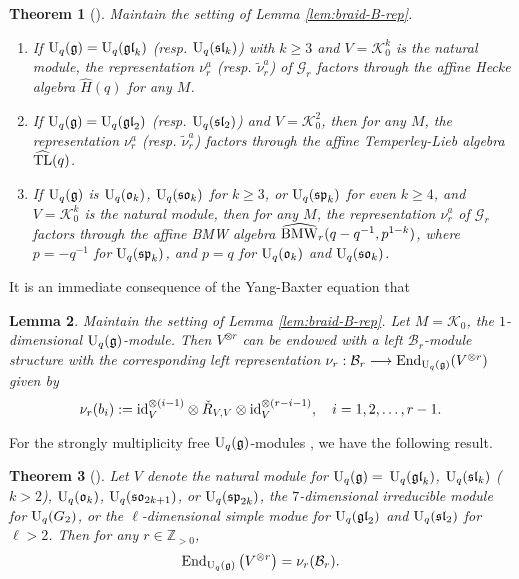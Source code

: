 \documentclass[12pt]{amsart}
\newtheorem{theorem}{Theorem}[section]
\newtheorem{lemma}[theorem]{Lemma}
\theoremstyle{definition}
\theoremstyle{remark}
\numberwithin{equation}{section}
\newcommand{\Z}{{\mathbb Z}}
\newcommand{\CB}{{\mathcal B}}
\newcommand{\CG}{{\mathcal G}}
\newcommand{\CK}{{\mathcal K}}
\newcommand{\id}{{\rm{id}}}
\newcommand{\mf}{\mathfrak}
\newcommand{\fg}{{\mf g}}
\newcommand{\be}{\begin{equation}}
\newcommand{\ee}{\end{equation}}
\newcommand{\U}{{\rm{U}}}
\newcommand{\End}{{\rm{End}}}
\newcommand{\fsl}{{\mathfrak {sl}}}
\newcommand{\gl}{{\mathfrak {gl}}}
\newcommand{\HH}{\widehat{H}}
\newcommand{\HTL}{\widehat{\rm TL}}
\newcommand{\HBMW}{\widehat{\rm BMW}}
\begin{document}
\begin{theorem}[\cite{DRV}] \label{thm:aff-Hecke-reps}
Maintain the setting of Lemma \ref{lem:braid-B-rep}. 
\begin{enumerate}
\item If $\U_q (\fg)=\U_q (\gl_k)$ (resp. $\U_q(\fsl_k)$) with $k\ge 3$ and $V=\CK_0^k$ is the natural module, 
 the  representation $\nu_r^a$ (resp. $\tilde\nu_r^a$) of $\CG_r$ factors through the affine Hecke algebra $\HH(q)$
 for any $M$. 

\item   If $\U_q (\fg)=\U_q (\gl_2)$ (resp. $\U_q(\fsl_2)$) and $V=\CK_0^2$,  then for any $M$, the representation $\nu_r^a$
(resp. $\tilde\nu_r^a$) factors through the affine Temperley-Lieb algebra $\HTL(q)$.

\item If $\U_q (\fg)$ is $\U_q (\mathfrak{o}_k)$,  $\U_q(\mathfrak{so}_k)$ for $k\ge 3$, or $\U_q (\mathfrak{sp}_k)$ for 
even $k\ge 4$, and $V=\CK_0^k$ is the natural module, 
then for any $M$, the  representation $\nu_r^a$ of $\CG_r$ factors through the affine BMW algebra $\HBMW_r(q-q^{-1},  p^{1-k})$,
where $p= -q^{-1}$ for  $\U_q (\mathfrak{sp}_k)$, and $p=q$ for $\U_q (\mathfrak{o}_k)$  and $\U_q(\mathfrak{so}_k)$.
\end{enumerate}
\end{theorem}
It is an immediate consequence of the Yang-Baxter equation that 
\begin{lemma}\label{lem:braid-rep}
Maintain the setting of Lemma \ref{lem:braid-B-rep}. Let $M=\CK_0$, the $1$-dimensional $\U_q(\fg)$-module.  Then
$V^{\otimes r}$ can be endowed with a left $\CB_r$-module structure with the corresponding left representation 
$\nu_r:  \CB_r\longrightarrow \End_{\U_q(\fg)}(V^{\otimes r})$ given by 
\be\label{eq:nu}
\nu_r(b_i):=\id_V^{\otimes (i-1)}\otimes\check{R}_{V, V}\otimes \id_V^{\otimes (r-i-1)},\quad i=1, 2, \dots, r-1.
\ee
\end{lemma}

For the strongly multiplicity free $\U_q(\fg)$-modules \cite{LZ06},  we have the following result. 
\begin{theorem}[\cite{LZ06}]\label{thm:sw-smf}
Let $V$ denote the natural module for $\U_q (\fg)=$ $\U_q (\gl_k)$,  $\U_q (\fsl_k)$ ($k>2$),  $\U_q (\mathfrak{o}_k)$,  
$\U_q(\mathfrak{so}_{2k+1})$, or $\U_q (\mathfrak{sp}_{2k})$,  the $7$-dimensional
irreducible module for $\U_q(G_2)$, or the $\ell$-dimensional simple modue for $\U_q(\gl_2)$ and $\U_q(\fsl_2)$ for $\ell>2$. 
Then for any $r\in\Z_{>0}$, 
\[
\End_{\U_q(\fg)}\left(V^{\otimes r}\right) =\nu_r(\CB_r).
\]
\end{theorem}
\end{document}
